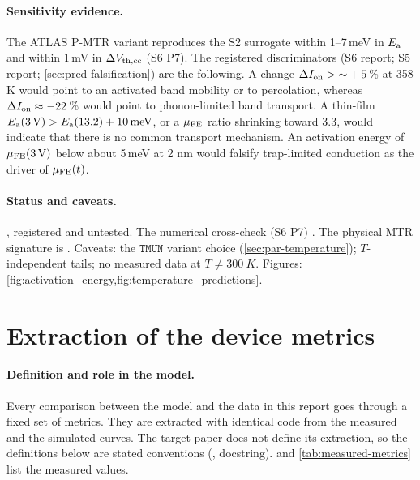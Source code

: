 \paragraph{Sensitivity evidence.}
The ATLAS P-MTR variant reproduces the S2 surrogate within 1--7\,meV in $E_{\mathrm{a}}$ and within 1\,mV in $\Delta V_{\mathrm{th,cc}}$ (S6 P7). The registered discriminators (S6 report; S5 report; \cref{sec:pred-falsification}) are the following. A change $\Delta I_{\mathrm{on}}>{\sim}+5$\,\% at 358 K would point to an activated band mobility or to percolation, whereas $\Delta I_{\mathrm{on}}\approx-22$\,\% would point to phonon-limited band transport. A thin-film $E_{\mathrm{a}}(\SI{3}{V})>E_{\mathrm{a}}(13.2)+\SI{10}{meV}$, or a $\mu_{\mathrm{FE}}$ ratio shrinking toward 3.3, would indicate that there is no common transport mechanism. An activation energy of $\mu_{\mathrm{FE}}(\SI{3}{V})$ below about 5\,meV at 2 nm would falsify trap-limited conduction as the driver of $\mu_{\mathrm{FE}}(t)$.

\paragraph{Status and caveats.}
\evPRED, registered and untested. The numerical cross-check (S6 P7) . The physical MTR signature is . Caveats: the $\texttt{TMUN}$ variant choice (\cref{sec:par-temperature}); $T$-independent tails; no measured data at $T\ne\SI{300}{K}$. Figures: \cref{fig:activation_energy,fig:temperature_predictions}.

\section{Extraction of the device metrics}\label{sec:der-metrics}

\paragraph{Definition and role in the model.}
Every comparison between the model and the data in this report goes through a fixed set of metrics. They are extracted with identical code from the measured and the simulated curves. The target paper does not define its extraction, so the definitions below are stated conventions (, docstring).  and \cref{tab:measured-metrics} list the measured values.

